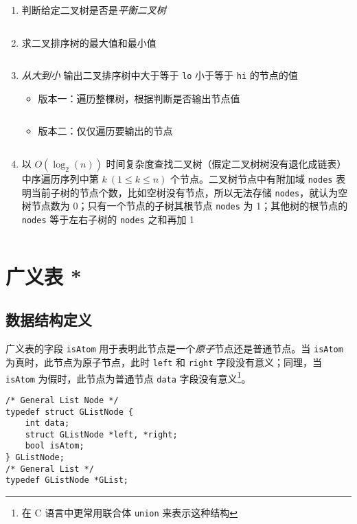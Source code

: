 \documentclass{ctexart}
\begin{document}
\begin{enumerate}
    \item 判断给定二叉树是否是\emph{平衡二叉树}
        \inputminted{c}{codes/is-avl-tree.c}

    \item 求二叉排序树的最大值和最小值
        \inputminted{c}{codes/max-and-min-value-in-bsttree.c}

    \item \emph{从大到小} 输出二叉排序树中大于等于 \texttt{lo} 小于等于 \texttt{hi} 的节点的值
        \begin{itemize}
            \item 版本一：遍历整棵树，根据判断是否输出节点值
                \inputminted{c}{codes/print-from-hi-to-lo-in-bsttree1.c}
            \item 版本二：仅仅遍历要输出的节点
                \inputminted{c}{codes/print-from-hi-to-lo-in-bsttree2.c}
        \end{itemize}

    \item 以 $O(\log_2(n))$ 时间复杂度查找二叉树（假定二叉树树没有退化成链表）中序遍历序列中第 $k\ (1 \le k \le n)$ 个节点。二叉树节点中有附加域 \texttt{nodes} 表明当前子树的节点个数，比如空树没有节点，所以无法存储 \texttt{nodes}，就认为空树节点数为 0；只有一个节点的子树其根节点 \texttt{nodes} 为 1；其他树的根节点的 \texttt{nodes} 等于左右子树的 \texttt{nodes} 之和再加 1 \label{find-kth-node-in-bitree}
        \inputminted{c}{codes/find-kth-node-in-bitree.c}

\end{enumerate}


\section{广义表 *}
\subsection{数据结构定义}
广义表的字段 \texttt{isAtom} 用于表明此节点是一个\emph{原子}节点还是普通节点。当 \texttt{isAtom} 为真时，此节点为原子节点，此时 \texttt{left} 和 \texttt{right} 字段没有意义；同理，当 \texttt{isAtom} 为假时，此节点为普通节点 \texttt{data} 字段没有意义\footnote{在 C 语言中更常用联合体 \texttt{union} 来表示这种结构}。
\begin{verbatim}
/* General List Node */
typedef struct GListNode {
    int data;
    struct GListNode *left, *right;
    bool isAtom;
} GListNode;
/* General List */
typedef GListNode *GList;
\end{verbatim}
\end{document}

